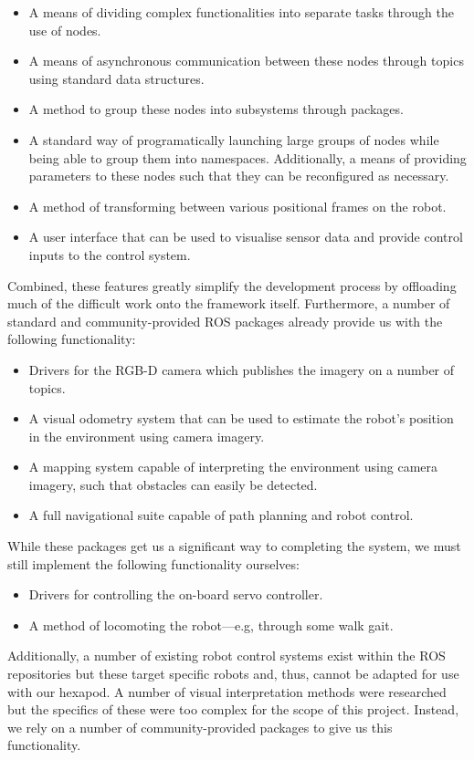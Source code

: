 \begin{itemize}
    \item A means of dividing complex functionalities into separate tasks through the use of nodes.
    \item A means of asynchronous communication between these nodes through topics using standard data structures.
    \item A method to group these nodes into subsystems through packages.
    \item A standard way of programatically launching large groups of nodes while being able to group them into namespaces. Additionally, a means of providing parameters to these nodes such that they can be reconfigured as necessary.
    \item A method of transforming between various positional frames on the robot.
    \item A user interface that can be used to visualise sensor data and provide control inputs to the control system.
\end{itemize}

Combined, these features greatly simplify the development process by offloading much of the difficult work onto the framework itself. Furthermore, a number of standard and community-provided ROS packages already provide us with the following functionality:

\begin{itemize}
    \item Drivers for the RGB-D camera which publishes the imagery on a number of topics.
    \item A visual odometry system that can be used to estimate the robot's position in the environment using camera imagery.
    \item A mapping system capable of interpreting the environment using camera imagery, such that obstacles can easily be detected.
    \item A full navigational suite capable of path planning and robot control.
\end{itemize}

While these packages get us a significant way to completing the system, we must still implement the following functionality ourselves:

\begin{itemize}
    \item Drivers for controlling the on-board servo controller.
    \item A method of locomoting the robot---e.g, through some walk gait.
\end{itemize}

Additionally, a number of existing robot control systems exist within the ROS repositories but these target specific robots and, thus, cannot be adapted for use with our hexapod. A number of visual interpretation methods were researched but the specifics of these were too complex for the scope of this project. Instead, we rely on a number of community-provided packages to give us this functionality.